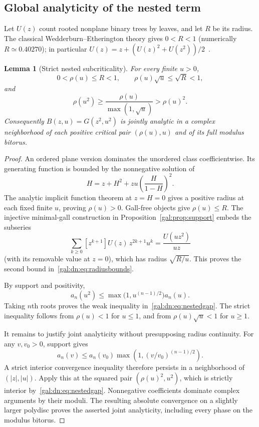 \documentclass[11pt,letterpaper]{article}
\numberwithin{equation}{section}
\newtheorem{lemma}[theorem]{Lemma}
\theoremstyle{definition}\newtheorem{definition}[theorem]{Definition}
\theoremstyle{remark}\newtheorem{remark}[theorem]{Remark}
\begin{document}
\subsection{Global analyticity of the nested term}
Let $U(z)$ count rooted nonplane binary trees by leaves, and let $R$ be its radius. The classical Wedderburn--Etherington theory gives $0<R<1$ (numerically $R\simeq0.40270$); in particular $U(z)=z+(U(z)^2+U(z^2))/2$~\cite{FS,comparison}.

\begin{lemma}[Strict nested subcriticality]\label{gal:dn:lem:nested}
For every finite $u>0$,
\begin{equation}\label{gal:dn:eq:radiusbounds}
0<\rho(u)\leq R<1,\qquad \rho(u)\sqrt u\leq\sqrt R<1,
\end{equation}
and
\begin{equation}\label{gal:dn:eq:nestedgap}
\rho(u^2)\geq\frac{\rho(u)}{\max(1,\sqrt u)}>\rho(u)^2.
\end{equation}
Consequently $B(z,u)=G(z^2,u^2)$ is jointly analytic in a complex neighborhood of each positive critical pair $(\rho(u),u)$ and of its full modulus bitorus.
\end{lemma}
\begin{proof}
An ordered plane version dominates the unordered class coefficientwise. Its generating function is bounded by the nonnegative solution of
\begin{equation}\label{gal:dn:eq:majorant}
 H=z+H^2+zu\left(\frac{H}{1-H}\right)^2.
\end{equation}
The analytic implicit function theorem at $z=H=0$ gives a positive radius at each fixed finite $u$, proving $\rho(u)>0$. Gall-free objects give $\rho(u)\leq R$. The injective minimal-gall construction in Proposition~\ref{gal:prop:support} embeds the subseries
\[
 \sum_{k\geq0}[z^{k+1}]U(z)\,z^{2k+1}u^k
       =\frac{U(uz^2)}{uz}
\]
(with its removable value at $z=0$), which has radius $\sqrt{R/u}$. This proves the second bound in~\eqref{gal:dn:eq:radiusbounds}.

By support and positivity,
\[
 a_n(u^2)\leq\max\bigl(1,u^{(n-1)/2}\bigr)a_n(u).
\]
Taking $n$th roots proves the weak inequality in~\eqref{gal:dn:eq:nestedgap}. The strict inequality follows from $\rho(u)<1$ for $u\leq1$, and from $\rho(u)\sqrt u<1$ for $u\geq1$.

It remains to justify joint analyticity without presupposing radius continuity. For any $v,v_0>0$, support gives
\begin{equation}\label{gal:dn:eq:weightcomparison}
 a_n(v)\leq a_n(v_0)\max\left(1,(v/v_0)^{(n-1)/2}\right).
\end{equation}
A strict interior convergence inequality therefore persists in a neighborhood of $(|z|,|u|)$. Apply this at the squared pair $(\rho(u)^2,u^2)$, which is strictly interior by~\eqref{gal:dn:eq:nestedgap}. Nonnegative coefficients dominate complex arguments by their moduli. The resulting absolute convergence on a slightly larger polydisc proves the asserted joint analyticity, including every phase on the modulus bitorus.
\end{proof}
\end{document}
